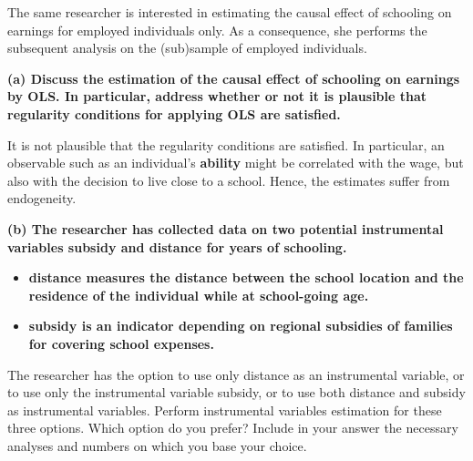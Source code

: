 \documentclass[
]{article}
\providecommand{\tightlist}{%
  \setlength{\itemsep}{0pt}\setlength{\parskip}{0pt}}
\begin{document}
The same researcher is interested in estimating the causal effect of
schooling on earnings for employed individuals only. As a consequence,
she performs the subsequent analysis on the (sub)sample of employed
individuals.

\textbf{(a) Discuss the estimation of the causal effect of schooling on
earnings by OLS. In particular, address whether or not it is plausible
that regularity conditions for applying OLS are satisfied.}

It is not plausible that the regularity conditions are satisfied. In
particular, an observable such as an individual's \textbf{ability} might
be correlated with the wage, but also with the decision to live close to
a school. Hence, the estimates suffer from endogeneity.

\textbf{(b) The researcher has collected data on two potential
instrumental variables subsidy and distance for years of schooling.}

\begin{itemize}
\tightlist
\item
  \textbf{distance measures the distance between the school location and
  the residence of the individual while at school-going age.}
\item
  \textbf{subsidy is an indicator depending on regional subsidies of
  families for covering school expenses.}
\end{itemize}

The researcher has the option to use only distance as an instrumental
variable, or to use only the instrumental variable subsidy, or to use
both distance and subsidy as instrumental variables. Perform
instrumental variables estimation for these three options. Which option
do you prefer? Include in your answer the necessary analyses and numbers
on which you base your choice.
\end{document}
